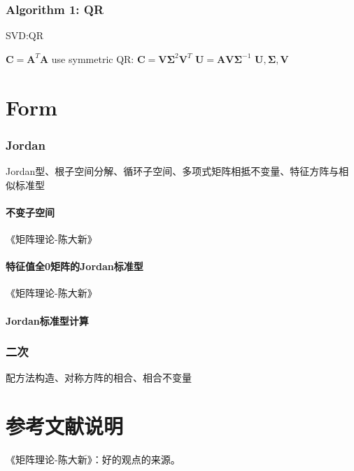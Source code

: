 \documentclass[UTF8]{../../09-Mathematics}
\begin{document}
\subsection{Algorithm 1: QR}

\begin{algorithm}[H]
    \caption{SVD:QR}\label{algo:SVD:QR}
    \SetAlgoLined
    $\boldsymbol  C = \boldsymbol  A^T \boldsymbol  A$\;
    use symmetric QR: $\boldsymbol  C = \boldsymbol  V  \boldsymbol \Sigma^2 \boldsymbol  V^T$\;
    $\boldsymbol U = \boldsymbol A \boldsymbol  V \boldsymbol \Sigma^{-1}$\;
    \KwRet $\boldsymbol U, \boldsymbol \Sigma,\boldsymbol V $\;
\end{algorithm}


\chapter{Form}

\subsection{Jordan}

Jordan型、根子空间分解、循环子空间、多项式矩阵相抵不变量、特征方阵与相似标准型


\subsubsection{不变子空间
}

《矩阵理论-陈大新》

\subsubsection{特征值全0矩阵的Jordan标准型}

《矩阵理论-陈大新》



\subsubsection{Jordan标准型计算}


\subsection{二次}
配方法构造、对称方阵的相合、相合不变量


\chapter{参考文献说明}
《矩阵理论-陈大新》：好的观点的来源。


\end{document}
